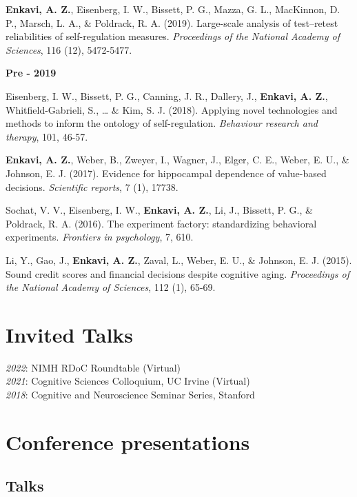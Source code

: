 \documentclass[11pt,]{article}
\begin{document}
\textbf{Enkavi, A. Z.}, Eisenberg, I. W., Bissett, P. G., Mazza, G. L.,
MacKinnon, D. P., Marsch, L. A., \& Poldrack, R. A. (2019). Large-scale
analysis of test--retest reliabilities of self-regulation measures.
\emph{Proceedings of the National Academy of Sciences}, 116 (12),
5472-5477.

\textbf{Pre - 2019}

Eisenberg, I. W., Bissett, P. G., Canning, J. R., Dallery, J.,
\textbf{Enkavi, A. Z.}, Whitfield-Gabrieli, S., \ldots{} \& Kim, S. J.
(2018). Applying novel technologies and methods to inform the ontology
of self-regulation. \emph{Behaviour research and therapy}, 101, 46-57.

\textbf{Enkavi, A. Z.}, Weber, B., Zweyer, I., Wagner, J., Elger, C. E.,
Weber, E. U., \& Johnson, E. J. (2017). Evidence for hippocampal
dependence of value-based decisions. \emph{Scientific reports}, 7 (1),
17738.

Sochat, V. V., Eisenberg, I. W., \textbf{Enkavi, A. Z.}, Li, J.,
Bissett, P. G., \& Poldrack, R. A. (2016). The experiment factory:
standardizing behavioral experiments. \emph{Frontiers in psychology}, 7,
610.

Li, Y., Gao, J., \textbf{Enkavi, A. Z.}, Zaval, L., Weber, E. U., \&
Johnson, E. J. (2015). Sound credit scores and financial decisions
despite cognitive aging. \emph{Proceedings of the National Academy of
Sciences}, 112 (1), 65-69.

\hypertarget{invited-talks}{%
\section{Invited Talks}\label{invited-talks}}

\emph{2022}: NIMH RDoC Roundtable (Virtual)\\
\emph{2021}: Cognitive Sciences Colloquium, UC Irvine (Virtual)\\
\emph{2018}: Cognitive and Neuroscience Seminar Series, Stanford

\hypertarget{conference-presentations}{%
\section{Conference presentations}\label{conference-presentations}}

\hypertarget{talks}{%
\subsection{Talks}\label{talks}}
\end{document}

